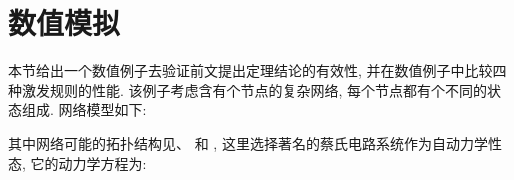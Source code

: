 \section{数值模拟}
        本节给出一个数值例子去验证前文提出定理结论的有效性, 并在数值例子中比较四种激发规则的性能. 该例子考虑含有个节点的复杂网络, 每个节点都有个不同的状态组成. 网络模型如下:
        \begin{comment}\label{simulate}
        \nonumber\dot{x}_{i}(t)=&f(x_{i}(t))-\theta(t)\rho(t)\sum^{100}_{j=1}l_{ij}(r_{t})\Gamma[h(x_{j}(t_{k}^{i}))-h(x_{i}(t_{k}^{i}))]+u_i(t),\\
         &\quad t_{k}^i\leq t< t_{k+1}^i, \quad i = 1,\cdots,100.\\
        \nonumber u_i(t)=&-\tau \rho(t)d_{i}(r_{t})\Gamma[h(x_{i}(t_{k}^{i}))-h(s(t_{k}^{i}))],
        \end{comment}
\begin{comment}[!htb]
\begin{minipage}[t]{0.48\linewidth}
\centering
\texttt{[image: nonlinear/NewL1.pdf]}
\caption{马尔可夫链处在状态下的网络拓扑结构.}\label{topology1}
\end{minipage}~~
\begin{minipage}[t]{0.48\linewidth}
\centering
\texttt{[image: nonlinear/NewL2.pdf]}
\caption{马尔可夫链处在状态下的网络拓扑结构.}\label{topology2}
\end{minipage}
\end{comment}
\begin{comment}[!htb]
\begin{minipage}[t]{0.48\linewidth}
\centering
\texttt{[image: nonlinear/NewL3.pdf]}
\caption{马尔可夫链处在状态下的网络拓扑结构.}\label{topology3}
\end{minipage}~~
\begin{minipage}[t]{0.48\linewidth}
\centering
\texttt{[image: nonlinear/randomvariabel.eps]}
\caption{马尔可夫链和随机变量的变化图.}\label{random}
\end{minipage}
\end{comment}
        其中网络可能的拓扑结构见、 和 , 这里选择著名的蔡氏电路系统作为自动力学性态, 它的动力学方程为:
        \begin{comment}
           f(x)=\left(
                  \begin{array}{c}
                    z_1(-x_1+x_2-g(x_1)) \\
                    x_1-x_2+x_3 \\
                    -z_2(x_2) \\
                  \end{array}
                \right)
           \end{comment}
